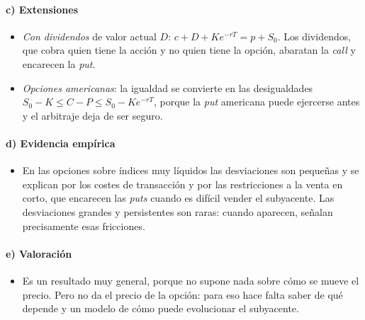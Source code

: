 \documentclass[11pt]{article}
\begin{document}
\paragraph{c) Extensiones}

\begin{itemize}
\item \emph{Con dividendos} de valor actual $D$: $c+D+Ke^{-rT}=p+S_0$. Los dividendos, que cobra quien tiene la acción y no quien tiene la opción, abaratan la \emph{call} y encarecen la \emph{put}.
\item \emph{Opciones americanas}: la igualdad se convierte en las desigualdades $S_0-K\leq C-P\leq S_0-Ke^{-rT}$, porque la \emph{put} americana puede ejercerse antes y el arbitraje deja de ser seguro\nocite{Hull2022Options}.
\end{itemize}

\paragraph{d) Evidencia empírica}

\begin{itemize}
\item En las opciones sobre índices muy líquidos las desviaciones son pequeñas y se explican por los costes de transacción y por las restricciones a la venta en corto, que encarecen las \emph{puts} cuando es difícil vender el subyacente. Las desviaciones grandes y persistentes son raras: cuando aparecen, señalan precisamente esas fricciones.
\end{itemize}

\paragraph{e) Valoración}

\begin{itemize}
\item Es un resultado muy general, porque no supone nada sobre cómo se mueve el precio. Pero no da el precio de la opción: para eso hace falta saber de qué depende y un modelo de cómo puede evolucionar el subyacente.
\end{itemize}
\end{document}
